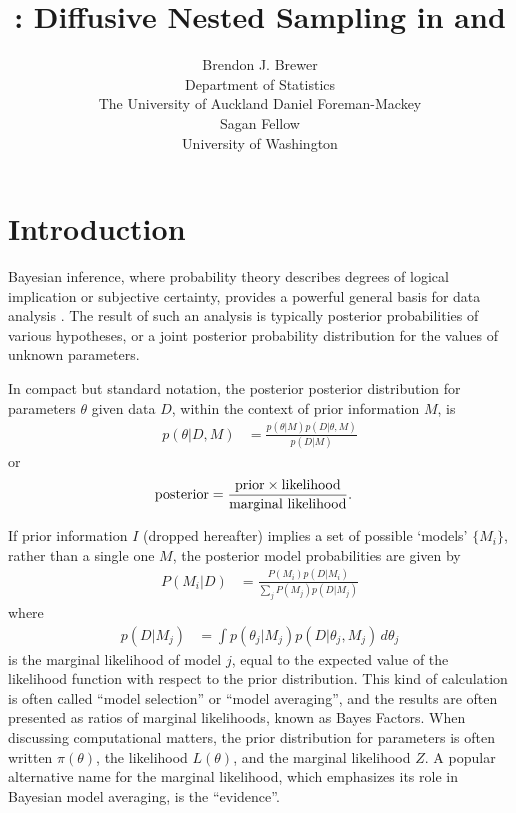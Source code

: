 \documentclass[article, nojss]{jss}
\author{Brendon J. Brewer\\Department of Statistics\\The University of Auckland\And 
        Daniel Foreman-Mackey\\Sagan Fellow\\University of Washington}
\title{\pkg{DNest4}: Diffusive Nested Sampling in
\proglang{C++} and \proglang{Python}}
\newcommand{\params}{\theta}
\newcommand{\data}{D}
\begin{document}
\maketitle


\section{Introduction}
Bayesian inference, where probability theory describes degrees of
logical implication or subjective certainty, provides a powerful general basis
for data analysis \citep{o2004kendall, sivia2006data}. The result of such
an analysis is typically
posterior probabilities of various hypotheses, or
a joint posterior probability distribution for the values of unknown
parameters.

In compact but standard notation, the posterior
posterior distribution for parameters $\params$ given data $\data$, within
the context of prior information $M$, is
\begin{align}
p(\params | \data, M) &=
\frac{p(\params | M)p(\data | \params, M)}{p(\data | M)}
\end{align}
or
\begin{align}
\textnormal{posterior} &=
\frac{\textnormal{prior} \times \textnormal{likelihood}}
     {\textnormal{marginal likelihood}}.
\end{align}

If prior information $I$ (dropped hereafter)
implies a set of possible `models' $\{M_i\}$,
rather than a single one $M$, the posterior model probabilities are given by
\begin{align}
P(M_i | \data) &=
\frac{P(M_i)p(\data | M_i)}{\sum_j P(M_j)p(\data | M_j)}
\end{align}
where
\begin{align}
p(\data | M_j) &= \int p(\theta_j | M_j)p(\data | \theta_j, M_j) \, d\theta_j
\end{align}
is the marginal likelihood of model $j$, equal to the expected value of the
likelihood function with respect to the prior distribution.
This kind of calculation is often
called ``model selection'' or ``model averaging'', and the results
are often presented as ratios
of marginal likelihoods, known as Bayes Factors.
When discussing computational matters, the prior distribution for parameters
is
often written $\pi(\theta)$, the likelihood $L(\theta)$,
and the marginal likelihood $Z$. A popular alternative name for the marginal
likelihood, which emphasizes its role in Bayesian model averaging,
is the ``evidence''.
\end{document}
